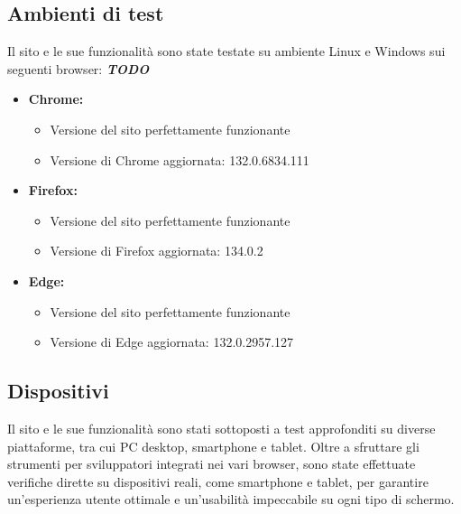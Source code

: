 \subsection{Ambienti di test}
Il sito e le sue funzionalità sono state testate su ambiente Linux e Windows sui seguenti browser: \textbf{\textit{TODO}}
\begin{itemize}
    \item \textbf{Chrome:}
        \begin{itemize}
            \item Versione del sito perfettamente funzionante
            \item Versione di Chrome aggiornata: 132.0.6834.111
        \end{itemize}
    \item \textbf{Firefox:}
        \begin{itemize}
            \item Versione del sito perfettamente funzionante
            \item Versione di Firefox aggiornata: 134.0.2
        \end{itemize}
    \item \textbf{Edge:} 
        \begin{itemize}
            \item Versione del sito perfettamente funzionante
            \item Versione di Edge aggiornata: 132.0.2957.127
        \end{itemize}
\end{itemize}
\subsection{Dispositivi}
Il sito e le sue funzionalit\`a sono stati sottoposti a test approfonditi su diverse piattaforme, tra cui PC desktop, smartphone e tablet. Oltre a sfruttare gli strumenti per sviluppatori integrati nei vari browser, sono state effettuate verifiche dirette su dispositivi reali, come smartphone e tablet, per garantire un'esperienza utente ottimale e un'usabilità impeccabile su ogni tipo di schermo.
